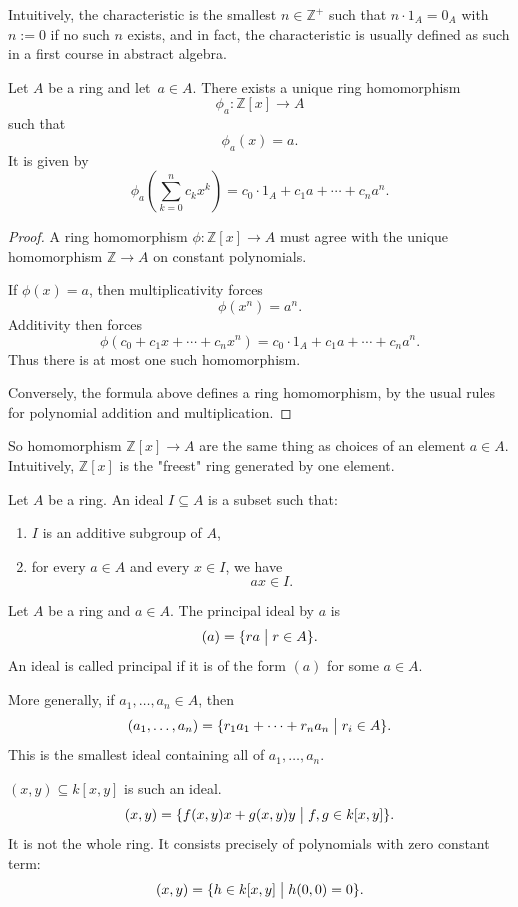 Intuitively, the characteristic is the smallest 
$n \in \mathbb Z^+$ such that $n \cdot 1_A = 0_A$ with 
$n := 0$ if no such $n$ exists, and in fact, the characteristic 
is usually defined as such in a first course in abstract 
algebra. 

\begin{prop}
    Let $A$ be a ring and let $a \in A$. There exists 
    a unique ring homomorphism 
    \[
        \phi_a : \mathbb Z[x] \to A
    \]
    such that 
    \[
        \phi_a(x) = a. 
    \]
    It is given by 
    \[
        \phi_a\left(\sum_{k=0}^n c_kx^k\right) = c_0 \cdot 1_A 
        + c_1 a + \cdots + c_n a^n.
    \]
\end{prop}
\begin{proof}
    A ring homomorphism $\phi : \mathbb Z[x] \to A$ must agree 
    with the unique homomorphism $\mathbb Z \to A$ on constant 
    polynomials. 

    If $\phi(x) = a$, then multiplicativity forces 
    \[
        \phi(x^n) = a^n. 
    \]
    Additivity then forces 
    \[
        \phi(c_0 + c_1x + \cdots + c_nx^n) 
        = c_0 \cdot 1_A + c_1a + \cdots + c_na^n. 
    \]
    Thus there is at most one such homomorphism. 

    Conversely, the formula above defines a ring homomorphism, by 
        the usual rules for polynomial addition and multiplication.
\end{proof}
So homomorphism $\mathbb Z[x] \to A$ are the same thing as 
choices of an element $a \in A$. Intuitively, $\mathbb Z[x]$ is 
the "freest" ring generated by one element. 

\begin{defn}[Ideal]
    Let $A$ be a ring. An ideal $I \subseteq A$ is a subset 
    such that: 
    \begin{enumerate}
        \item $I$ is an additive subgroup of $A$, 
        \item for every $a \in A$ and every $x \in I$, we have 
            \[
                ax \in I. 
            \]
    \end{enumerate}
\end{defn}

\begin{defn}
    Let $A$ be a ring and $a \in A$. The principal ideal 
    by $a$ is 
    \[
        (a) = \{ra \bigm| r \in A\}. 
    \]
    An ideal is called principal if it is of the form 
    $(a)$ for some $a \in A$.
\end{defn}
More generally, if $a_1, \ldots, a_n \in A$, then 
\[
    (a_1,\ldots,a_n) = 
    \{r_1a_1 + \cdots + r_na_n \bigm| r_i \in A\}.
\]
This is the smallest ideal containing all of $a_1,\ldots,a_n$. 
\begin{ex}
    $(x,y) \subseteq k[x,y]$ is such an ideal. 
    \[
        (x,y) = 
        \{f(x,y)x + g(x,y)y \bigm| f,g \in k[x,y]\}. 
    \]
    It is not the whole ring. It consists precisely of 
    polynomials with zero constant term: 
    \[
        (x,y) = \{h \in k[x,y] \bigm| h(0,0) = 0\}.
    \]
\end{ex}

